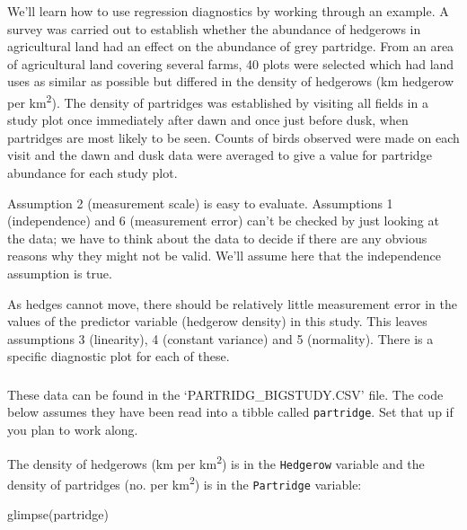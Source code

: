 \documentclass[
]{book}
\newenvironment{Shaded}{\begin{snugshade}}{\end{snugshade}}
\newcommand{\FunctionTok}[1]{\textcolor[rgb]{0.00,0.00,0.00}{#1}}
\newcommand{\NormalTok}[1]{#1}
\newenvironment{greybox}{
  \definecolor{shadecolor}{rgb}{0.95,0.95,0.95}  %
  \color{black}
  \begin{shaded}}
 {\end{shaded}}
\newenvironment{infobox}[1]
  {
  \begin{itemize}
  \renewcommand{\labelitemi}{
    \raisebox{-.7\height}[0pt][0pt]{
      {\setkeys{Gin}{width=3em,keepaspectratio}
        \texttt{[image: images/\#1]}}
    }
  }
  \setlength{\fboxsep}{1em}
  \begin{greybox}
  \item
  }
  {
  \end{greybox}
  \end{itemize}
  }
\begin{document}
We'll learn how to use regression diagnostics by working through an example. A survey was carried out to establish whether the abundance of hedgerows in agricultural land had an effect on the abundance of grey partridge. From an area of agricultural land covering several farms, 40 plots were selected which had land uses as similar as possible but differed in the density of hedgerows (km hedgerow per km\textsuperscript{2}). The density of partridges was established by visiting all fields in a study plot once immediately after dawn and once just before dusk, when partridges are most likely to be seen. Counts of birds observed were made on each visit and the dawn and dusk data were averaged to give a value for partridge abundance for each study plot.

Assumption 2 (measurement scale) is easy to evaluate. Assumptions 1 (independence) and 6 (measurement error) can't be checked by just looking at the data; we have to think about the data to decide if there are any obvious reasons why they might not be valid. We'll assume here that the independence assumption is true.

As hedges cannot move, there should be relatively little measurement error in the values of the predictor variable (hedgerow density) in this study. This leaves assumptions 3 (linearity), 4 (constant variance) and 5 (normality). There is a specific diagnostic plot for each of these.

\begin{infobox}{action}

\hypertarget{section-12}{%
\subsubsection*{}\label{section-12}}

These data can be found in the `PARTRIDG\_BIGSTUDY.CSV' file. The code below assumes they have been read into a tibble called \texttt{partridge}. Set that up if you plan to work along.

\end{infobox}

The density of hedgerows (km per km\textsuperscript{2}) is in the \texttt{Hedgerow} variable and the density of partridges (no. per km\textsuperscript{2}) is in the \texttt{Partridge} variable:

\begin{Shaded}
\begin{Highlighting}[]
\FunctionTok{glimpse}\NormalTok{(partridge)}
\end{Highlighting}
\end{Shaded}
\end{document}
